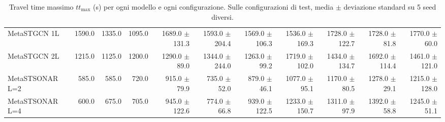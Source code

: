 \begin{table}
\begin{tabular}{@{}lrrrrrrrrrr@{}}
    MetaSTGCN 1L              & 1590.0  & 1335.0  & 1095.0  & 1689.0 {\fontsize{4}{4}\selectfont$\pm$131.3} & 1593.0 {\fontsize{4}{4}\selectfont$\pm$204.4} & 1569.0 {\fontsize{4}{4}\selectfont$\pm$106.3} & 1536.0 {\fontsize{4}{4}\selectfont$\pm$169.3}   & 1728.0 {\fontsize{4}{4}\selectfont$\pm$122.7}   & 1728.0 {\fontsize{4}{4}\selectfont$\pm$81.8}   & 1770.0 {\fontsize{4}{4}\selectfont$\pm$60.0}   \\
    MetaSTGCN 2L              & 1215.0  & 1125.0  & 1200.0  & 1290.0 {\fontsize{4}{4}\selectfont$\pm$89.0}   & 1344.0 {\fontsize{4}{4}\selectfont$\pm$244.0} & 1263.0 {\fontsize{4}{4}\selectfont$\pm$99.2}  & 1719.0 {\fontsize{4}{4}\selectfont$\pm$102.0}   & 1434.0 {\fontsize{4}{4}\selectfont$\pm$134.7}   & 1692.0 {\fontsize{4}{4}\selectfont$\pm$114.4}   & 1461.0 {\fontsize{4}{4}\selectfont$\pm$121.0}   \\
    MetaSTSONAR L=2           & 585.0   & 585.0   & 720.0   & 915.0 {\fontsize{4}{4}\selectfont$\pm$79.9}   & 735.0 {\fontsize{4}{4}\selectfont$\pm$52.0}   & 879.0 {\fontsize{4}{4}\selectfont$\pm$46.1}   & 1077.0 {\fontsize{4}{4}\selectfont$\pm$95.1}   & 1170.0 {\fontsize{4}{4}\selectfont$\pm$80.5}   & 1278.0 {\fontsize{4}{4}\selectfont$\pm$29.1}   & 1215.0 {\fontsize{4}{4}\selectfont$\pm$128.0}   \\
    MetaSTSONAR L=4           & 600.0   & 675.0   & 705.0   & 945.0 {\fontsize{4}{4}\selectfont$\pm$122.6}   & 774.0 {\fontsize{4}{4}\selectfont$\pm$66.8}   & 939.0 {\fontsize{4}{4}\selectfont$\pm$122.5}  & 1233.0 {\fontsize{4}{4}\selectfont$\pm$150.7}   & 1311.0 {\fontsize{4}{4}\selectfont$\pm$97.9}   & 1392.0 {\fontsize{4}{4}\selectfont$\pm$58.8}   & 1245.0 {\fontsize{4}{4}\selectfont$\pm$51.1}   \\
    \bottomrule
  \end{tabular}
  \caption{Travel time massimo $tt_{\max}$ (s) per ogni modello e ogni configurazione. Sulle configurazioni di test, media $\pm$ deviazione standard su 5 seed diversi.}
  \label{tab:ttmax-full}
\end{table}

